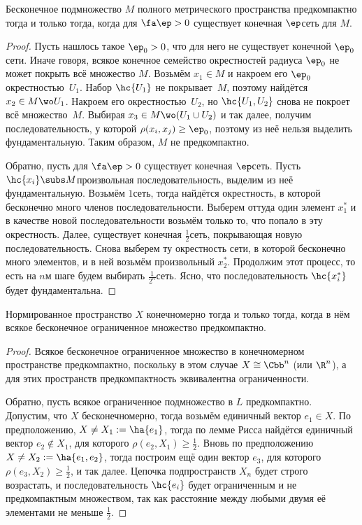 \documentclass[a4paper]{article}
\begin{document}
\begin{theorem}
Бесконечное подмножество $M$ полного метрического пространства предкомпактно тогда и только тогда,
когда для $\fa \ep > 0$ существует конечная $\ep$\д сеть для $M$.
\end{theorem}
\begin{proof}
Пусть нашлось такое $\ep_0 > 0$, что для него не существует конечной $\ep_0$\д сети.
Иначе говоря, всякое конечное семейство окрестностей радиуса $\ep_0$ не может покрыть
всё множество $M$. Возьмём $x_1 \in M$ и накроем его $\ep_0$\д окрестностью~$U_1$. Набор
$\hc{U_1}$ не покрывает~$M$, поэтому найдётся $x_2 \in M \wo U_1$.
Накроем его окрестностью~$U_2$, но $\hc{U_1,U_2}$ снова не покроет всё множество~$M$.
Выбирая $x_3 \in M \wo (U_1 \cup U_2)$ и так далее, получим последовательность, у которой
$\rho(x_i, x_j) \ge \ep_0$, поэтому из неё нельзя выделить фундаментальную.
Таким образом, $M$ не предкомпактно.

Обратно, пусть для $\fa \ep > 0$ существует конечная $\ep$\д сеть. Пусть $\hc{x_i} \subs M$\т произвольная
последовательность, выделим из неё фундаментальную.
Возьмём $1$\д сеть, тогда найдётся окрестность, в которой бесконечно много членов последовательности.
Выберем оттуда один элемент $x_1^*$ и в качестве новой последовательности возьмём только то, что
попало в эту окрестность. Далее, существует конечная $\frac12$\д сеть, покрывающая новую
последовательность. Снова выберем ту окрестность сети, в которой бесконечно много элементов,
и в ней возьмём произвольный $x_2^*$.
Продолжим этот процесс, то есть на $n$\д м шаге будем выбирать $\frac1{2^n}$\д сеть.
Ясно, что последовательность $\hc{x_i^*}$ будет фундаментальна.
\end{proof}

\begin{lemma}
Нормированное пространство $X$ конечномерно тогда и только тогда,
когда в нём всякое бесконечное ограниченное множество предкомпактно.
\end{lemma}
\begin{proof}
Всякое бесконечное ограниченное множество в конечномерном пространстве
предкомпактно, поскольку в этом случае $X \cong \Cbb^n$ (или $\R^n$),
а для этих пространств предкомпактность эквивалентна ограниченности.

Обратно, пусть всякое ограниченное подмножество в $L$ предкомпактно.
Допустим, что $X$ бесконечномерно, тогда возьмём единичный вектор $e_1 \in X$.
По предположению, $X \neq X_1 := \ha{e_1}$, тогда по лемме Рисса найдётся единичный
вектор $e_2 \notin X_1$, для которого $\rho(e_2, X_1) \ge \frac12$.
Вновь по предположению $X \neq X_2 := \ha{e_1,e_2}$, тогда построим
ещё один вектор $e_3$, для которого $\rho(e_3, X_2) \ge \frac12$, и так далее.
Цепочка подпространств $X_n$ будет строго возрастать, и последовательность $\hc{e_i}$
будет ограниченным и не предкомпактным множеством, так как расстояние между любыми двумя
её элементами не меньше $\frac12$.
\end{proof}
\end{document}
